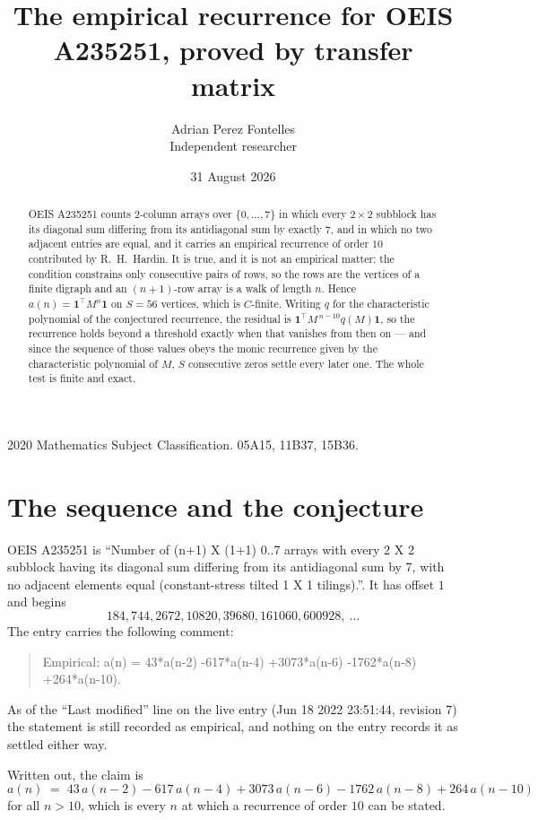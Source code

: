 \documentclass[11pt,a4paper]{article}
\title{The empirical recurrence for OEIS A235251, proved by transfer matrix}
\author{Adrian Perez Fontelles\\ \small Independent researcher}
\date{31 August 2026}
\theoremstyle{plain}
\theoremstyle{definition}
\begin{document}
\maketitle

\begin{abstract}
OEIS A235251 counts $2$-column arrays over $\{0,\dots,7\}$ in which every
$2\times2$ subblock has its diagonal sum differing from its antidiagonal sum by
exactly $7$, and in which no two adjacent entries are equal, and it
carries an empirical recurrence of order $10$ contributed by R.~H.~Hardin. It is true,
and it is not an empirical matter: the condition constrains only consecutive pairs of rows,
so the rows are the vertices of a finite digraph and an $(n+1)$-row array is a walk of
length $n$. Hence $a(n)=\mathbf{1}^{\!\top}M^{n}\mathbf{1}$ on $S=56$ vertices, which
is $C$-finite. Writing $q$ for the characteristic polynomial of the conjectured recurrence,
the residual is $\mathbf{1}^{\!\top}M^{\,n-10}q(M)\mathbf{1}$, so the recurrence
holds beyond a threshold exactly when that vanishes from then on --- and since the sequence
of those values obeys the monic recurrence given by the characteristic polynomial of $M$,
$S$ consecutive zeros settle every later one. The whole test is finite and exact.
\end{abstract}

\noindent\small 2020 Mathematics Subject Classification. 05A15, 11B37, 15B36.\normalsize

\section{The sequence and the conjecture}

OEIS A235251 is ``Number of (n+1) X (1+1) 0..7 arrays with every 2 X 2 subblock having its diagonal sum differing from its antidiagonal sum by 7, with no adjacent elements equal (constant-stress tilted 1 X 1 tilings).''. It has offset
$1$ and begins
\[
184, 744, 2672, 10820, 39680, 161060, 600928,\ \dots
\]
The entry carries the following comment:
\begin{quote}\small
Empirical: a(n) = 43*a(n-2) -617*a(n-4) +3073*a(n-6) -1762*a(n-8) +264*a(n-10).
\end{quote}
As of the ``Last modified'' line on the live entry (Jun 18 2022 23:51:44, revision 7) the statement is
still recorded as empirical, and nothing on the entry records it as settled either way.

Written out, the claim is
\begin{equation}\label{eq:conj}
a(n)\;=\;43\,a(n-2) - 617\,a(n-4) + 3073\,a(n-6) - 1762\,a(n-8) + 264\,a(n-10)
\end{equation}
for all $n>10$, which is every $n$ at which a recurrence of order $10$ can be
stated.
\end{document}
